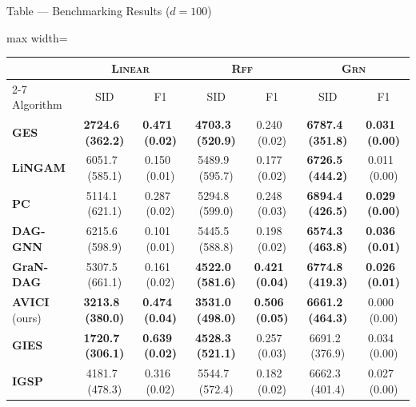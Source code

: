 \documentclass[aspectratio=169,10pt]{beamer}
\newcommand{\err}[1]{\tiny{$\,$(#1)}}
\newcommand{\highlight}[1]{\textbf{#1}}
\newcommand{\domain}[1]{\textsc{#1}}
\newcommand{\ges}{\textbf{GES}}
\newcommand{\pc}{\textbf{PC}}
\newcommand{\lingam}{\textbf{LiNGAM}}
\newcommand{\daggnn}{\textbf{DAG-GNN}}
\newcommand{\grandag}{\textbf{GraN-DAG}}
\newcommand{\oursobserv}{\textbf{AVICI} (ours)}
\newcommand{\gies}{\textbf{GIES}}
\newcommand{\igsp}{\textbf{IGSP}}
\begin{document}
\begin{frame}{Table --- Benchmarking Results ($d=100$)}
\scriptsize
\begin{adjustbox}{max width=\textwidth}
\begin{tabular}{lcccccc}
\toprule
 &           \multicolumn{2}{c}{\domain{Linear}}            &            \multicolumn{2}{c}{\domain{Rff}}           &        \multicolumn{2}{c}{\domain{Grn}}       \\
\cmidrule{2-7}
Algorithm &              SID &               F1  &              SID &               F1 &              SID &               F1\\
\midrule
\ges               &  \highlight{2724.6 \err{362.2}} &  \highlight{0.471 \err{0.02}} &  \highlight{4703.3 \err{520.9}} &              0.240 \err{0.02} &  \highlight{6787.4 \err{351.8}} &  \highlight{0.031 \err{0.00}} \\
\lingam            &              6051.7 \err{585.1} &              0.150 \err{0.01} &              5489.9 \err{595.7} &              0.177 \err{0.02} &  \highlight{6726.5 \err{444.2}} &              0.011 \err{0.00} \\
\pc                &              5114.1 \err{621.1} &              0.287 \err{0.02} &              5294.8 \err{599.0} &              0.248 \err{0.03} &  \highlight{6894.4 \err{426.5}} &  \highlight{0.029 \err{0.00}} \\
\daggnn            &              6215.6 \err{598.9} &              0.101 \err{0.01} &              5445.5 \err{588.8} &              0.198 \err{0.02} &  \highlight{6574.3 \err{463.8}} &  \highlight{0.036 \err{0.01}} \\
\grandag           &              5307.5 \err{661.1} &              0.161 \err{0.02} &  \highlight{4522.0 \err{581.6}} &  \highlight{0.421 \err{0.04}} & \highlight{6774.8 \err{419.3}} & \highlight{0.026 \err{0.01}}\\
\oursobserv &  \highlight{3213.8 \err{380.0}} &  \highlight{0.474 \err{0.04}} &  \highlight{3531.0 \err{498.0}} &  \highlight{0.506 \err{0.05}} &  \highlight{6661.2 \err{464.3}} &              0.000 \err{0.00} \\
\midrule
\gies              &  \highlight{1720.7 \err{306.1}} &  \highlight{0.639 \err{0.02}} &  \highlight{4528.3 \err{521.1}} &              0.257 \err{0.03} &              6691.2 \err{376.9} &              0.034 \err{0.00} \\
\igsp              &              4181.7 \err{478.3} &              0.316 \err{0.02} &              5544.7 \err{572.4} &              0.182 \err{0.02} &              6662.3 \err{401.4} &              0.027 \err{0.00} \\

\end{tabular}
\end{adjustbox}
\end{frame}
\end{document}
